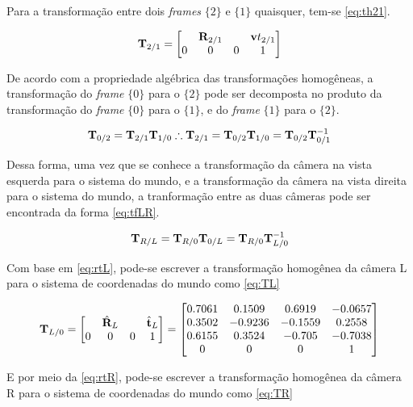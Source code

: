 Para a transformação entre dois \textit{frames} $\{2\}$ e $\{1\}$ quaisquer, tem-se \eqref{eq:th21}.

\begin{equation}
\mathbf{T}_{2/1} = \begin{bmatrix}
	& \mathbf{R}_{2/1} & & \mathbf{v}{t}_{2/1} \\
	0 & 0 & 0 & 1
\end{bmatrix}
\label{eq:th21}
\end{equation}

De acordo com a propriedade algébrica das transformações homogêneas, a transformação do \textit{frame} $\{0\}$ para o $\{2\}$ pode ser decomposta no produto da transformação do \textit{frame} $\{0\}$ para o $\{1\}$, e do   \textit{frame} $\{1\}$ para o $\{2\}$.

\begin{equation}
	\mathbf{T}_{0/2} = \mathbf{T}_{2/1} \mathbf{T}_{1/0} \therefore \mathbf{T}_{2/1} = \mathbf{T}_{0/2} \mathbf{T}_{1/0} = \mathbf{T}_{0/2} \mathbf{T}^{-1}_{0/1}
\end{equation}

Dessa forma, uma vez que se conhece a transformação da câmera na vista esquerda para o sistema do mundo, e a transformação da câmera na vista direita para o sistema do mundo, a tranformação entre as duas câmeras pode ser encontrada da forma \eqref{eq:tfLR}.

\begin{equation}
	\mathbf{T}_{R/L} = \mathbf{T}_{R/0}\mathbf{T}_{0/L} =  \mathbf{T}_{R/0}\mathbf{T}_{L/0}^{-1}
	\label{eq:tfLR}
\end{equation}

Com base em \eqref{eq:rtL}, pode-se escrever a transformação homogênea da câmera L para o sistema de coordenadas do mundo como \eqref{eq:TL}

\begin{equation}\label{eq:TL}
	\mathbf{T}_{L/0} = \begin{bmatrix}
		& \hat{\mathbf{R}}_L & & \hat{\mathbf{t}}_L\\
		0 & 0 & 0 & 1
	\end{bmatrix} = \begin{bmatrix}
	0.7061  &  0.1509  &  0.6919 & -0.0657 \\
	0.3502  & -0.9236  & -0.1559 & 0.2558  \\
	0.6155  &  0.3524  & -0.705  & -0.7038 \\
	0       &  0      &   0      & 1
\end{bmatrix}
\end{equation}  

E por meio da \eqref{eq:rtR}, pode-se escrever a transformação homogênea da câmera R para o sistema de coordenadas do mundo como \eqref{eq:TR}

